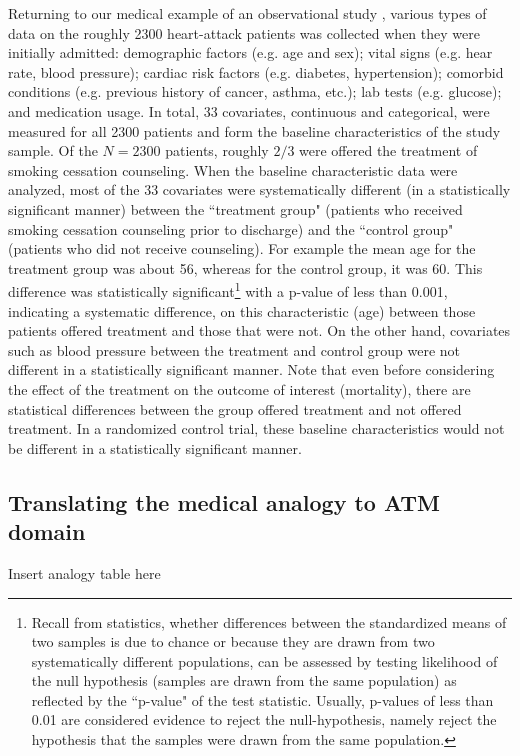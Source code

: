 Returning to our medical example of an observational study \cite{austin2011tutorial}, various types of data on the roughly 2300 heart-attack patients was collected when they were initially admitted: demographic factors (e.g. age and sex); vital signs (e.g. hear rate, blood pressure); cardiac risk factors (e.g. diabetes, hypertension); comorbid conditions (e.g. previous history of cancer, asthma, etc.); lab tests (e.g. glucose); and medication usage.  In total, 33 covariates, continuous and categorical, were measured for all 2300 patients and form the baseline characteristics of the study sample.  Of the $N=2300$ patients, roughly $2/3$ were offered the treatment of smoking cessation counseling.  When the baseline characteristic data were analyzed, most of the 33 covariates were systematically different (in a statistically significant manner) between the ``treatment group" (patients who received smoking cessation counseling prior to discharge) and the ``control group" (patients who did not receive counseling).  For example the mean age for the treatment group was about 56, whereas for the control group, it was 60.  This difference was statistically significant\footnote{Recall from statistics, whether differences between the standardized means of two samples is due to chance or because they are drawn from two systematically different populations, can be assessed by testing likelihood of the null hypothesis (samples are drawn from the same population) as reflected by the ``p-value" of the test statistic.  Usually, p-values of less than 0.01 are considered evidence to reject the null-hypothesis, namely reject the hypothesis that the samples were drawn from the same population.} with a p-value of less than 0.001, indicating a systematic difference, on this characteristic (age) between those patients offered treatment and those that were not.  On the other hand, covariates such as blood pressure between the treatment and control group were not different in a statistically significant manner.  Note that even before considering the effect of the treatment on the outcome of interest (mortality), there are statistical differences between the group offered treatment and not offered treatment. In a randomized control trial, these baseline characteristics would not be different in a statistically significant manner.  

\subsection{Translating the medical analogy to ATM domain}
Insert analogy table here

